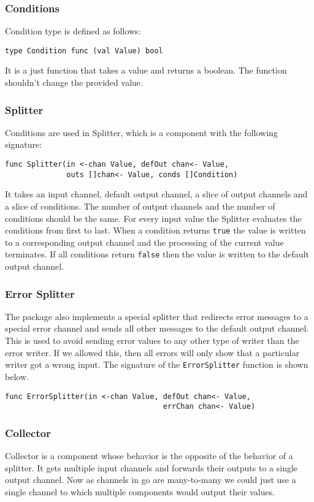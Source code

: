 \subsubsection{Conditions}
Condition type is defined as follows:
\begin{lstlisting}
type Condition func (val Value) bool
\end{lstlisting}
It is a just function that takes a value and returns a boolean.
The function shouldn't change the provided value.

\subsubsection{Splitter}
Conditions are used in Splitter, which is a component with the 
following signature:
\begin{lstlisting}
func Splitter(in <-chan Value, defOut chan<- Value, 
			  outs []chan<- Value, conds []Condition)
\end{lstlisting}
It takes an input channel, default output channel, a slice of output channels 
and a slice of conditions.
The number of output channels and the number of conditions should be the same.
For every input value the Splitter evaluates the conditions from first to last.
When a condition returns \texttt{true} the value is written to a 
corresponding output channel 
and the processing of the current value terminates. If all conditions 
return \texttt{false} then the value is written to the default output channel.

\subsubsection{Error Splitter}
The package also implements a special splitter that redirects error messages
to a special error channel and sends all other messages to the default output 
channel. This is used to avoid sending error values to 
any other type of writer than the error writer. If we allowed this, then
all errors will only show that a particular writer got a wrong input.
The signature of the \texttt{ErrorSplitter} function is shown below.
\begin{lstlisting}
func ErrorSplitter(in <-chan Value, defOut chan<- Value, 
                                    errChan chan<- Value)
\end{lstlisting}

\subsubsection{Collector}
Collector is a component whose behavior is the opposite of the behavior 
of a splitter. It gets multiple input channels
and forwards their outputs to a single output channel. Now as channels
in go are many-to-many we could just use a single channel to which
multiple components would output their values. 


